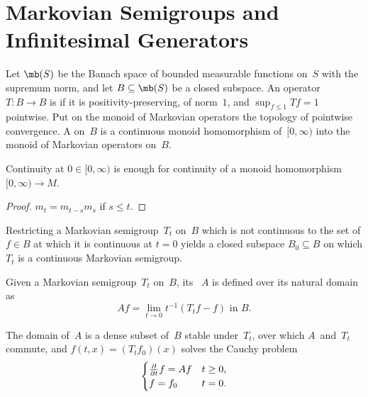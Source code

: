 \section	{Markovian Semigroups and Infinitesimal Generators}

\begin	{definition}
Let $\mb(S)$ be the Banach space of bounded measurable functions on~$S$
with the supremum norm,
and let \( B \subseteq \mb(S) \) be a closed subspace.
An operator \( T \colon B \to B \) is 
if it is positivity-preserving, of norm~$1$,
and \( \sup_{f\le1} Tf = 1 \) pointwise.
Put on the monoid of Markovian operators
the topology of pointwise convergence.
A  on~$B$ is a continuous monoid homomorphism
of~$[0,\infty)$ into the monoid of Markovian operators on~$B$.
\end	{definition}

\begin	{lemma}
Continuity at \( 0 \in [0,\infty) \)
is enough for continuity of a monoid homomorphism
\( [0,\infty) \to M \).
\end	{lemma}
\begin	{proof}
\( m_t = m_{t-s} m_s \) if \( s \le t \).
\end	{proof}

\begin	{proposition}
Restricting a Markovian semigroup~$T_t$ on~$B$ which is not continuous
to the set of \( f \in B \) at which it is continuous at \( t = 0 \)
yields a closed subspace \( B_0 \subseteq B \)
on which $T_t$ is a continuous Markovian semigroup.
\end	{proposition}

\begin	{definition}
Given a Markovian semigroup~$T_t$ on~$B$,
its ~$A$ is defined over its natural domain as \[
	\text{\(Af = \lim_{t\to0} t^{-1}(T_t f - f)\) in~$B$.}
\]
\end	{definition}

\begin	{theorem}
The domain of~$A$ is a dense subset of~$B$ stable under~$T_t$,
over which $A$~and~$T_t$ commute,
and \( f(t,x) = (T_t f_0)(x) \) solves the Cauchy problem \[
	\begin	{cases}
	\frac\partial{\partial t} f = Af & t \ge 0 \text,\\
	f = f_0                          & t =   0 \text.
	\end	{cases}
\]
\end	{theorem}

